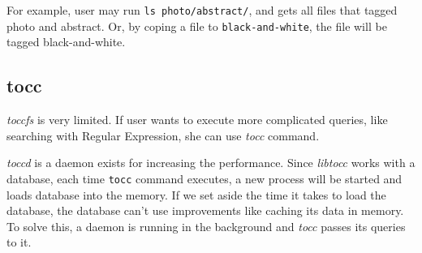 For example, user may run \texttt{ls photo/abstract/}, and gets all files that tagged photo and abstract. Or, by coping a file to \texttt{black-and-white}, the file will be tagged black-and-white.

\subsection{tocc}
\emph{toccfs} is very limited. If user wants to execute more complicated queries, like searching with Regular Expression, she can use \emph{tocc} command.

\emph{toccd} is a daemon exists for increasing the performance. Since \emph{libtocc} works with a database, each time \texttt{tocc} command executes, a new process will be started and loads database into the memory. If we set aside the time it takes to load the database, the database can't use improvements like caching its data in memory. To solve this, a daemon is running in the background and \emph{tocc} passes its queries to it.

